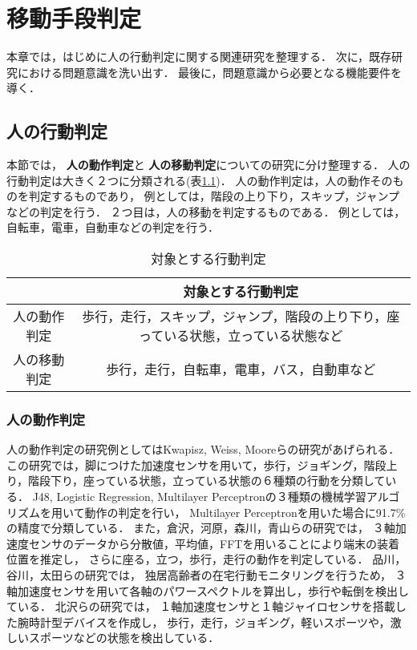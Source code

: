 \chapter{移動手段判定}
本章では，はじめに人の行動判定に関する関連研究を整理する．
次に，既存研究における問題意識を洗い出す．
最後に，問題意識から必要となる機能要件を導く．
\section{人の行動判定}
本節では，
{\bf 人の動作判定}と
{\bf 人の移動判定}についての研究に分け整理する．
人の行動判定は大きく２つに分類される(表\ref{対象とする行動判定})．
人の動作判定は，人の動作そのものを判定するものであり，
例としては，階段の上り下り，スキップ，ジャンプなどの判定を行う．
２つ目は，人の移動を判定するものである．
例としては，自転車，電車，自動車などの判定を行う．

\begin{table}[htbp]
 \begin{center}
 \begin{tabular}{c|c}
  \hline
  & 対象とする行動判定　\\
  \hline
  人の動作判定 & 歩行，走行，スキップ，ジャンプ，階段の上り下り，座っている状態，立っている状態など	 \\
  人の移動判定 & 歩行，走行，自転車，電車，バス，自動車など \\
  \hline
 \end{tabular}
 \end{center}
 \caption{対象とする行動判定}
 \label{対象とする行動判定}
\end{table}

\subsection{人の動作判定}
人の動作判定の研究例としてはKwapisz, Weiss, Mooreらの研究\cite{Kwapisz:2011:ARU:1964897.1964918}があげられる．
この研究では，脚につけた加速度センサを用いて，歩行，ジョギング，階段上り，階段下り，座っている状態，立っている状態の６種類の行動を分類している．
J48, Logistic Regression, Multilayer Perceptronの３種類の機械学習アルゴリズムを用いて動作の判定を行い，
Multilayer Perceptronを用いた場合に91.7\%の精度で分類している．
また，倉沢，河原，森川，青山らの研究\cite{倉沢央:2006-05-23}では，
３軸加速度センサのデータから分散値，平均値，FFTを用いることにより端末の装着位置を推定し，
さらに座る，立つ，歩行，走行の動作を判定している．
品川，谷川，太田らの研究\cite{weko_12507_1}では，
独居高齢者の在宅行動モニタリングを行うため，
３軸加速度センサを用いて各軸のパワースペクトルを算出し，歩行や転倒を検出している．
北沢らの研究\cite{北沢俊二200210}では，
１軸加速度センサと１軸ジャイロセンサを搭載した腕時計型デバイスを作成し，
歩行，走行，ジョギング，軽いスポーツや，激しいスポーツなどの状態を検出している．


